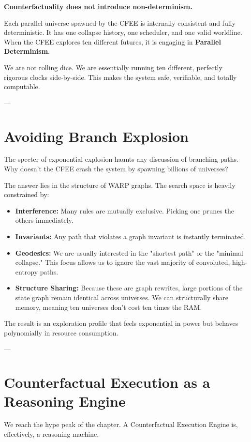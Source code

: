 \textbf{Counterfactuality does not introduce non-determinism.}

Each parallel universe spawned by the CFEE is internally consistent and fully deterministic. It has one collapse history, one scheduler, and one valid worldline. When the CFEE explores ten different futures, it is engaging in \textbf{Parallel Determinism}. 

We are not rolling dice. We are essentially running ten different, perfectly rigorous clocks side-by-side. This makes the system safe, verifiable, and totally computable.

---

\section{Avoiding Branch Explosion}

The specter of exponential explosion haunts any discussion of branching paths. Why doesn't the CFEE crash the system by spawning billions of universes?

The answer lies in the structure of WARP graphs. The search space is heavily constrained by:
\begin{itemize}
    \item \textbf{Interference:} Many rules are mutually exclusive. Picking one prunes the others immediately.
    \item \textbf{Invariants:} Any path that violates a graph invariant is instantly terminated.
    \item \textbf{Geodesics:} We are usually interested in the "shortest path" or the "minimal collapse." This focus allows us to ignore the vast majority of convoluted, high-entropy paths.
    \item \textbf{Structure Sharing:} Because these are graph rewrites, large portions of the state graph remain identical across universes. We can structurally share memory, meaning ten universes don't cost ten times the RAM.
\end{itemize}

The result is an exploration profile that feels exponential in power but behaves polynomially in resource consumption.

---

\section{Counterfactual Execution as a Reasoning Engine}

We reach the hype peak of the chapter. A Counterfactual Execution Engine is, effectively, a reasoning machine.


